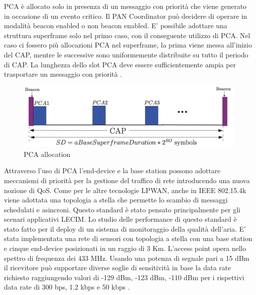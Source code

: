 \documentclass[12pt,a4paper,openright,twoside]{report}
\begin{document}
PCA \`e allocato solo in presenza di un messaggio con priorit\`a che viene generato in occasione di un evento critico. 
Il PAN Coordinator pu\`o decidere di operare in modalit\`a beacon enabled o non beacon enabled. E' possibile adottare una struttura superframe solo nel primo caso, con il conseguente utilizzo di PCA. Nel caso ci fossero pi\`u allocazioni PCA nel superframe, la prima viene messa all'inizio del CAP, mentre le successive sono uniformemente distribuite su tutto il periodo di CAP. La lunghezza dello slot PCA deve essere sufficientemente ampia per trasportare un messaggio con priorit\`a \cite{K7}.
\begin{figure}[h]                      
\begin{center} 
\includegraphics[width=\textwidth]{PCA_Allocation.png}
\caption[PCA allocation]{PCA allocation}\label{fig:quinta}
\end{center}
\end{figure}

Attraverso l'uso di PCA l'end-device e la base station possono adottare meccanismi di priorit\`a per la gestione del traffico di rete introducendo una nuova nozione di QoS. 
Come per le altre tecnologie LPWAN, anche in IEEE 802.15.4k viene adottata una topologia a stella che permette lo scambio di messaggi schedulati e asincroni.
Questo standard \`e stato pensato principalmente per gli scenari applicativi LECIM. 
Lo studio delle performance di questo standard \`e stato fatto per il deploy di un sistema di monitoraggio della qualit\`a dell'aria. E' stata implementata una rete di sensori con topologia a stella con una base station e cinque end-device posizionati in un raggio di 3 Km. L'access point opera nello spettro di frequenza dei 433 MHz. Usando una potenza di segnale pari a 15 dBm il ricevitore pu\`o supportare diverse soglie di sensitivit\`a in base la data rate richiesto raggiungendo valori di -129 dBm, -123 dBm, -110 dBm per i rispettivi data rate di 300 bps, 1.2 kbps e 50 kbps \cite{K8}.
\end{document}

